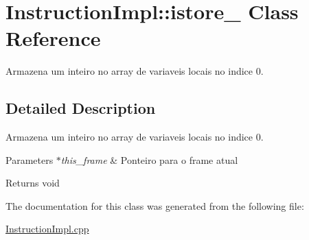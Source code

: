 \hypertarget{class_instruction_impl_1_1istore__0}{}\section{Instruction\+Impl\+:\+:istore\+\_ Class Reference}
\label{class_instruction_impl_1_1istore__0}


Armazena um inteiro no array de variaveis locais no indice 0.  




\subsection{Detailed Description}
Armazena um inteiro no array de variaveis locais no indice 0. 


\begin{DoxyParams}{Parameters}
{\em $\ast$this\+\_\+frame} & Ponteiro para o frame atual \\
\hline
\end{DoxyParams}
\begin{DoxyReturn}{Returns}
void 
\end{DoxyReturn}


The documentation for this class was generated from the following file\+:\begin{DoxyCompactItemize}
\item 
\hyperlink{_instruction_impl_8cpp}{Instruction\+Impl.\+cpp}\end{DoxyCompactItemize}
